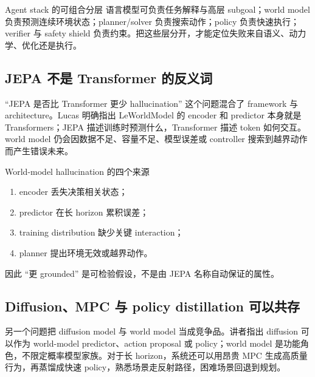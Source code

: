 \documentclass[a4paper]{article}
\begin{document}

\begin{knowledgebox}{Agent stack 的可组合分层}
语言模型可负责任务解释与高层 subgoal；world model 负责预测连续环境状态；planner/solver 负责搜索动作；policy 负责快速执行；verifier 与 safety shield 负责约束。把这些层分开，才能定位失败来自语义、动力学、优化还是执行。
\end{knowledgebox}

\subsection{JEPA 不是 Transformer 的反义词}

``JEPA 是否比 Transformer 更少 hallucination'' 这个问题混合了 framework 与 architecture。Lucas 明确指出 LeWorldModel 的 encoder 和 predictor 本身就是 Transformers；JEPA 描述训练时预测什么，Transformer 描述 token 如何交互。world model 仍会因数据不足、容量不足、模型误差或 controller 搜索到越界动作而产生错误未来。


\begin{warningbox}{World-model hallucination 的四个来源}
\begin{enumerate}
  \item encoder 丢失决策相关状态；
  \item predictor 在长 horizon 累积误差；
  \item training distribution 缺少关键 interaction；
  \item planner 提出环境无效或越界动作。
\end{enumerate}
因此 ``更 grounded'' 是可检验假设，不是由 JEPA 名称自动保证的属性。
\end{warningbox}

\subsection{Diffusion、MPC 与 policy distillation 可以共存}

另一个问题把 diffusion model 与 world model 当成竞争品。讲者指出 diffusion 可以作为 world-model predictor、action proposal 或 policy；world model 是功能角色，不限定概率模型家族。对于长 horizon，系统还可以用昂贵 MPC 生成高质量行为，再蒸馏成快速 policy，熟悉场景走反射路径，困难场景回退到规划。
\end{document}
